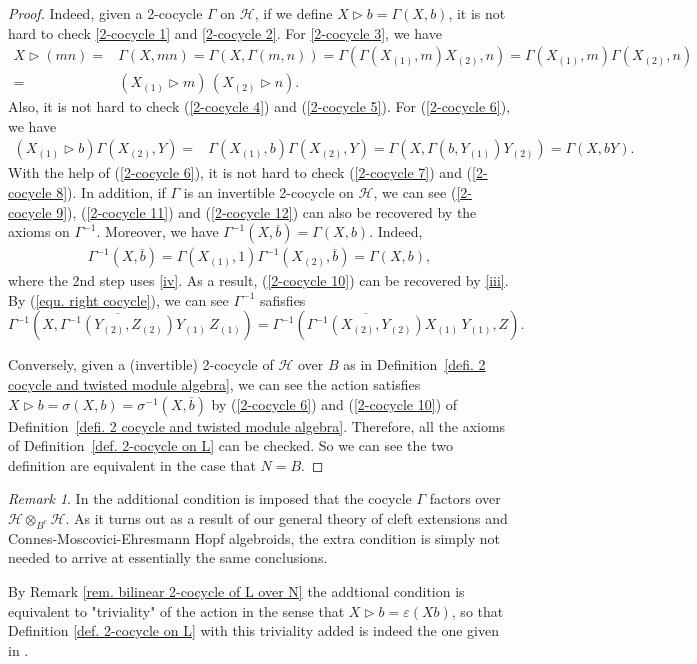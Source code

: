 \documentclass[a4paper,reqno]{amsart}
\numberwithin{equation}{section}
\theoremstyle{plain}
\theoremstyle{remark}
\newtheorem{rem}[thm]{Remark}
\numberwithin{equation}{section}
\renewcommand{\o}{{}_{\scriptscriptstyle{(1)}}}
\renewcommand{\t}{{}_{\scriptscriptstyle{(2)}}}
\newcommand\ou[1]{\otimes_{#1}}
\newcommand{\la}{{\triangleright}}
\newcommand{\CH}{\mathcal{H}}
\begin{document}
\begin{proof}
   Indeed, given a 2-cocycle $\Gamma$ on $\CH$, if we define $X\la b=\Gamma(X, b)$, it is not hard to check \eqref{2-cocycle 1} and \eqref{2-cocycle 2}. For \eqref{2-cocycle 3}, we have
    \begin{align*}
        X\la(mn)=&\Gamma(X, mn)=\Gamma(X,\Gamma(m,n))=\Gamma(\Gamma(X\o, m)X\t, n)=\Gamma(X\o, m)\Gamma(X\t, n)\\
        =&(X\o\la m)\, (X\t\la n).
    \end{align*}
    Also, it is not hard to check (\ref{2-cocycle 4}) and (\ref{2-cocycle 5}). For (\ref{2-cocycle 6}), we have
    \begin{align*}
        (X\o\la b)\Gamma(X\t, Y)=&\Gamma(X\o, b)\Gamma(X\t, Y)=\Gamma(X, \Gamma(b, Y\o)Y\t)=\Gamma(X, bY).
    \end{align*}
    With the help of (\ref{2-cocycle 6}), it is not hard to check (\ref{2-cocycle 7}) and (\ref{2-cocycle 8}). In addition, if $\Gamma$ is an invertible 2-cocycle on $\CH$, we can see (\ref{2-cocycle 9}), (\ref{2-cocycle 11}) and (\ref{2-cocycle 12}) can also be recovered by the axioms on $\Gamma^{-1}$.
    Moreover, we have $\Gamma^{-1}(X, \overline{b})=\Gamma(X, b)$. Indeed,
    \begin{align*}
        \Gamma^{-1}(X, \overline{b})=\Gamma(X\o, 1)\Gamma^{-1}(X\t, \overline{b})=\Gamma(X, b),
    \end{align*}
    where the 2nd step uses \eqref{iv}. As a result, (\ref{2-cocycle 10})  can be recovered by \eqref{iii}. By (\ref{equ. right cocycle}), we can see $\Gamma^{-1}$ safisfies 
    \[\Gamma^{-1}(X, \overline{\Gamma^{-1}(Y\t, Z\t)}Y\o\, Z\o)=\Gamma^{-1}(\overline{\Gamma^{-1}(X\t, Y\t)}X\o\, Y\o, Z).\]
    
    Conversely, given a (invertible) 2-cocycle of $\CH$ over $B$ as in Definition~\ref{defi. 2 cocycle and twisted module algebra}, we can see the action satisfies $X\la b=\sigma(X, b)=\sigma^{-1}(X,\overline{b})$ by (\ref{2-cocycle 6}) and (\ref{2-cocycle 10}) of Definition~\ref{defi. 2 cocycle and twisted module algebra}. Therefore, all the axioms of Definition~\ref{def. 2-cocycle on L} can be checked. So we can see the two definition are equivalent in the case that $N=B$.   \end{proof}
  
\begin{rem}  
    In \cite{Boehm,HM22,HM23} the additional condition is imposed that the cocycle $\Gamma$ factors over $\CH\ou{B^e}\CH$.  As it turns out as a result of our general theory of cleft extensions and Connes-Moscovici-Ehresmann Hopf algebroids, the extra condition is simply not needed to arrive at essentially the same conclusions.  
    
    By Remark \ref{rem. bilinear 2-cocycle of L over N} the addtional condition is equivalent to "triviality" of the action in the sense that $X\la b=\varepsilon(Xb)$, so that Definition \ref{def. 2-cocycle on L} with this triviality added is indeed the one given in \cite{Boehm, HM22, HM23}.
\end{rem}
\end{document}
